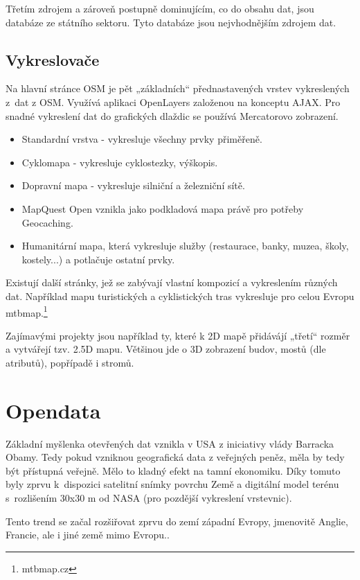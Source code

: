 Třetím zdrojem a zároveň postupně dominujícím, co do obsahu dat, jsou
databáze ze státního sektoru. Tyto databáze jsou nejvhodnějším zdrojem
dat.

\subsection{Vykreslovače}
\label{Vykreslovače}
Na hlavní stránce OSM je pět „základních“ přednastavených vrstev vykreslených 
z~dat z OSM. Využívá aplikaci OpenLayers založenou na konceptu AJAX.
Pro snadné vykreslení dat do grafických dlaždic se používá Mercatorovo zobrazení.

\begin{itemize}

  \item Standardní vrstva - vykresluje všechny prvky přiměřeně.
  \item Cyklomapa - vykresluje cyklostezky, výškopis. 
  \item Dopravní mapa - vykresluje silniční a železniční sítě.
  \item MapQuest Open vznikla jako podkladová mapa právě pro potřeby 
Geocaching.
  \item Humanitární mapa, která vykresluje služby (restaurace, banky, muzea, 
  školy, kostely...)  a potlačuje ostatní prvky. 

\end{itemize}

Existují další stránky, jež se zabývají vlastní kompozicí a vykreslením
různých dat. Například mapu turistických a cyklistických tras vykresluje
pro celou Evropu mtbmap.\footnote{mtbmap.cz}

Zajímavými projekty jsou například ty, které k 2D mapě přidávájí „třetí“ rozměr a
vytvářejí tzv. 2.5D mapu. Většinou jde o 3D zobrazení budov, mostů (dle
atributů), popřípadě i stromů.

\section{Opendata}
\label{opendata}
Základní myšlenka otevřených dat vznikla v USA z iniciativy vlády Barracka Obamy.
Tedy pokud vzniknou geografická data z veřejných peněz, měla by tedy být
přístupná veřejně. Mělo to kladný efekt na tamní ekonomiku. Díky tomuto byly
zprvu k~dispozici satelitní snímky povrchu Země a digitální model terénu
s~rozlišením 30x30 m od NASA (pro pozdější vykreslení vrstevnic).

Tento trend se začal rozšiřovat zprvu do zemí západní Evropy,
jmenovitě Anglie, Francie, ale i jiné země mimo Evropu..

